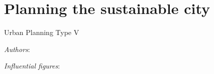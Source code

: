 \documentclass{article}
\newcommand{\bisection}[1]{\textbf{\textit{#1}}}
\begin{document}
\pagebreak
\section{Planning the sustainable city}

Urban Planning Type V

\textit{Authors}:

\textit{Influential figures}:


\bisection{}

\bisection{}

\bisection{}

\bisection{}

\bisection{}

\bisection{}

\bisection{}

\bisection{}

\bisection{}

\bisection{}

\bisection{}


\printbibliography
\end{document}
